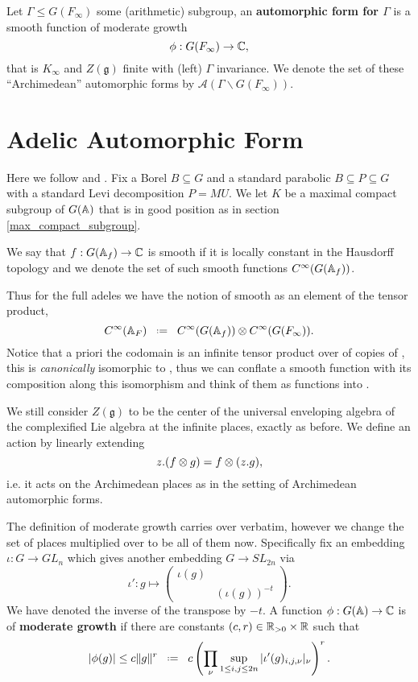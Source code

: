 	\begin{Definition}
		Let \(\Gamma\leq G(F_\infty)\) some (arithmetic) subgroup, an \textbf{automorphic form for \(\Gamma\)} is a smooth function of moderate growth 
		\[\phi: G(F_\infty) \to \C,\]
		that is \(K_\infty\) and \(Z(\mathfrak{g})\) finite with  (left) \(\Gamma\) invariance. We denote the set of these ``Archimedean'' automorphic forms by \(\mathcal{A}(\Gamma \backslash G(F_\infty))\).
	\end{Definition}


\section{Adelic Automorphic Form}
Here we follow \cite[I.2.17]{moeglinSpectralDecompositionEisenstein1995} and \cite[1.2]{borelAutomorphicFormsRepresentations1979}. Fix a Borel \(B\subseteq G\) and a standard parabolic \(B\subseteq P \subseteq G\) with a standard Levi decomposition \(P = MU\). We let \(K\) be a maximal compact subgroup of \(G(\A)\) that is in good position as in section \ref{max_compact_subgroup}.

We say that \(f: G(\A_f) \to \C\) is smooth if it is locally constant in the Hausdorff topology and we denote the set of such smooth functions \(C^\infty(G(\A_f))\).

	Thus for the full adeles we have the notion of smooth as an element of the tensor product,
	\[C^\infty(\mathbb{A}_F) \defeq   C^\infty(G(\mathbb{A}_f))   \otimes   C^\infty(G(F_\infty)).\]
	Notice that a priori the codomain is an infinite tensor product over \C of copies of \C, this is \textit{canonically} isomorphic to \C, thus we can conflate a smooth function with its composition along this isomorphism and think of them as functions into \C.

	We still consider \(Z(\mathfrak{g})\) to be the center of the universal enveloping algebra of the complexified Lie algebra at the infinite places, exactly as before. We define an action by linearly extending
    \[z.(f\otimes g) = f\otimes (z.g),\]
    i.e. it acts on the Archimedean places as in the setting of Archimedean automorphic forms. 
	
	The definition of moderate growth carries over verbatim, however we change the set of places multiplied over to be all of them now. Specifically fix an embedding \(\iota : G\to GL_n\) which gives another embedding \(G\to SL_{2n}\) via
	\[\iota': g\mapsto \begin{pmatrix}
		\iota (g) & \\
		& (\iota (g))^{-t}
	\end{pmatrix}.\]
	We have denoted the inverse of the transpose by \(-t\). A function \(\phi : G(\A) \to \C \) is of \textbf{moderate growth} if there are constants \((c,r)\in \R_{>0}\times \R\) such that 
	\[|\phi(g)| \leq c\norm{g}^r \defeq c \left(\prod_{\nu} \sup_{1\leq i, j\leq 2n} |\iota' (g)_{i,j, \nu}|_\nu\right)^r.\]
    
